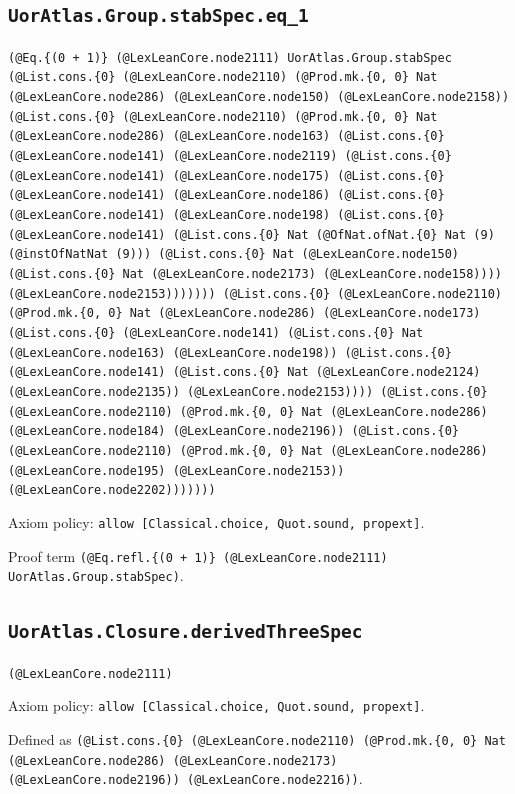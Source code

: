 \documentclass[11pt]{article}
\begin{document}
\subsection*{\texttt{UorAtlas.Group.stabSpec.eq\_1}}
\noindent\texttt{(@Eq.\{(0 + 1)\} (@LexLeanCore.node2111) UorAtlas.Group.stabSpec (@List.cons.\{0\} (@LexLeanCore.node2110) (@Prod.mk.\{0, 0\} Nat (@LexLeanCore.node286) (@LexLeanCore.node150) (@LexLeanCore.node2158)) (@List.cons.\{0\} (@LexLeanCore.node2110) (@Prod.mk.\{0, 0\} Nat (@LexLeanCore.node286) (@LexLeanCore.node163) (@List.cons.\{0\} (@LexLeanCore.node141) (@LexLeanCore.node2119) (@List.cons.\{0\} (@LexLeanCore.node141) (@LexLeanCore.node175) (@List.cons.\{0\} (@LexLeanCore.node141) (@LexLeanCore.node186) (@List.cons.\{0\} (@LexLeanCore.node141) (@LexLeanCore.node198) (@List.cons.\{0\} (@LexLeanCore.node141) (@List.cons.\{0\} Nat (@OfNat.ofNat.\{0\} Nat (9) (@instOfNatNat (9))) (@List.cons.\{0\} Nat (@LexLeanCore.node150) (@List.cons.\{0\} Nat (@LexLeanCore.node2173) (@LexLeanCore.node158)))) (@LexLeanCore.node2153))))))) (@List.cons.\{0\} (@LexLeanCore.node2110) (@Prod.mk.\{0, 0\} Nat (@LexLeanCore.node286) (@LexLeanCore.node173) (@List.cons.\{0\} (@LexLeanCore.node141) (@List.cons.\{0\} Nat (@LexLeanCore.node163) (@LexLeanCore.node198)) (@List.cons.\{0\} (@LexLeanCore.node141) (@List.cons.\{0\} Nat (@LexLeanCore.node2124) (@LexLeanCore.node2135)) (@LexLeanCore.node2153)))) (@List.cons.\{0\} (@LexLeanCore.node2110) (@Prod.mk.\{0, 0\} Nat (@LexLeanCore.node286) (@LexLeanCore.node184) (@LexLeanCore.node2196)) (@List.cons.\{0\} (@LexLeanCore.node2110) (@Prod.mk.\{0, 0\} Nat (@LexLeanCore.node286) (@LexLeanCore.node195) (@LexLeanCore.node2153)) (@LexLeanCore.node2202)))))))}\par
\noindent Axiom policy: \texttt{allow [Classical.choice, Quot.sound, propext]}.\par
\noindent Proof term \texttt{(@Eq.refl.\{(0 + 1)\} (@LexLeanCore.node2111) UorAtlas.Group.stabSpec)}.\par
\subsection*{\texttt{UorAtlas.Closure.derivedThreeSpec}}
\noindent\texttt{(@LexLeanCore.node2111)}\par
\noindent Axiom policy: \texttt{allow [Classical.choice, Quot.sound, propext]}.\par
\noindent Defined as \texttt{(@List.cons.\{0\} (@LexLeanCore.node2110) (@Prod.mk.\{0, 0\} Nat (@LexLeanCore.node286) (@LexLeanCore.node2173) (@LexLeanCore.node2196)) (@LexLeanCore.node2216))}.\par
\end{document}
